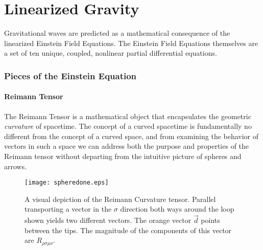 \chapter{Linearized Gravity}
Gravitational waves are predicted as a mathematical consequence of the linearized Einstein Field Equations. The Einstein Field Equations themselves are a set of ten unique, coupled, nonlinear partial differential equations.  

\subsection{Pieces of the Einstein Equation}
\subsubsection{Reimann Tensor}
The Reimann Tensor is a mathematical object that encapsulates the geometric \textit{curvature} of spacetime. The concept of a curved spacetime is fundamentally no different from the concept of a curved space, and from examining the behavior of vectors in such a space we can address both the purpose and properties of the Reimann tensor without departing from the intuitive picture of spheres and arrows.

\begin{figure}[h!]
\texttt{[image: spheredone.eps]}
\caption{A visual depiction of the Reimann Curvature tensor. Parallel transporting a vector in the $\sigma$ direction both ways around the loop shown yields two different vectors. The orange vector $\vec{d}$ points between the tips. The magnitude of the components of this vector are $R_{\rho \sigma \mu \nu}$.}
\label{fig:sphere}
\end{figure}

